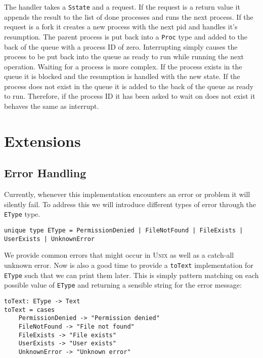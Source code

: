 \documentclass[logo,bsc,singlespacing,parskip]{infthesis}
\begin{document}
The handler takes a \texttt{Sstate} and a request. If the request is a return
value it appends the result to the list of done processes and runs the next
process. If the request is a fork it creates a new process with the next pid
and handles it's resumption. The parent process is put back into a
\texttt{Proc} type and added to the back of the queue with a process ID of
zero. Interrupting simply causes the process to be put back into the queue as
ready to run while running the next operation. Waiting for a process is more
complex. If the process exists in the queue it is blocked and the resumption is
handled with the new state. If the process does not exist in the queue it is
added to the back of the queue as ready to run. Therefore, if the process ID it
has been asked to wait on does not exist it behaves the same as interrupt.

\chapter{Extensions}
\label{extensions}

\section{Error Handling}

Currently, whenever this implementation encounters an error or problem it will
silently fail. To address this we will introduce different types of error
through the \texttt{EType} type.

\begin{lstlisting}[language=unison]
unique type EType = PermissionDenied | FileNotFound | FileExists | UserExists | UnknownError
\end{lstlisting}

We provide common errors that might occur in \textsc{Unix} as well as a
catch-all unknown error. Now is also a good time to provide a \texttt{toText}
implementation for \texttt{EType} such that we can print them later. This is 
simply pattern matching on each possible value of \texttt{EType} and returning a sensible string for the error message:

\begin{lstlisting}[language=unison]
toText: EType -> Text
toText = cases  
    PermissionDenied -> "Permission denied"
    FileNotFound -> "File not found"
    FileExists -> "File exists"
    UserExists -> "User exists"
    UnknownError -> "Unknown error"
\end{lstlisting}
\end{document}
